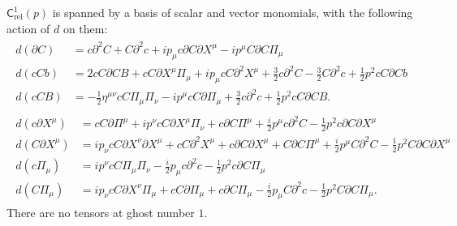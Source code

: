 \documentclass[11pt,reqno,a4paper,final]{amsart}
\theoremstyle{plain}
\theoremstyle{definition}
\renewcommand{\d}{\partial}
\newcommand{\Crel}{\mathsf{C}_{\mathrm{rel}}} %
\newcommand{\1}{\mathbb{1}}
\numberwithin{equation}{section}
\begin{document}
\begin{appendices}
$\Crel^1(p)$ is spanned by a basis of scalar and vector monomials, with the following action of $d$ on them:
\begin{align}
  \begin{split} \label{eq:d-on-scalars-gh-no-1}
    d(\d C) &= c \d^2 C + C \d^2 c + i p_\mu c \d C \d X^\mu - i p^\mu C \d C \Pi_\mu \\
    d(c C b) &= 2 c C \d C B + c C \d X^\mu \Pi_\mu + i p_\mu c C \d^2 X^\mu + \tfrac32 c \d^2 C - \tfrac32 C \d^2 c + \tfrac12 p^2 c C \d C b\\
    d(c C B) &= - \tfrac12 \eta^{\mu\nu} c C \Pi_\mu \Pi_\nu - i p^\mu c C \d \Pi_\mu + \tfrac32 c \d^2 c + \tfrac12 p^2 c C \d C B.
  \end{split}\\[1ex]
  \begin{split}     \label{eq:d-on-vectors-gh-no-1}
    d(c \d X^\mu) &= c C \d \Pi^\mu + i p^\nu c C \d X^\mu \Pi_\nu + c \d C \Pi^\mu + \tfrac{i}2 p^\mu c \d^2 C - \tfrac12 p^2 c \d C \d X^\mu \\
    d(C \d X^\mu) &= i p_\nu c C \d X^\nu \d X^\mu + c C \d^2 X^\mu + c \d C \d X^\mu + C \d C \Pi^\mu + \tfrac{i}2 p^\mu C \d^2 C - \tfrac12 p^2 C \d C \d X^\mu\\
    d(c \Pi_\mu)&= i p^\nu c C \Pi_\mu \Pi_\nu -\tfrac{i}2 p_\mu c \d^2 c - \tfrac12 p^2 c \d C \Pi_\mu\\
    d(C \Pi_\mu) &= i p_\nu c C \d X^\nu \Pi_\mu + c C \d \Pi_\mu + c \d C \Pi_\mu - \tfrac{i}2 p_\mu C \d^2 c - \tfrac12 p^2 C \d C \Pi_\mu.
  \end{split}
\end{align}
There are no tensors at ghost number $1$.  


\end{appendices}
\end{document}
